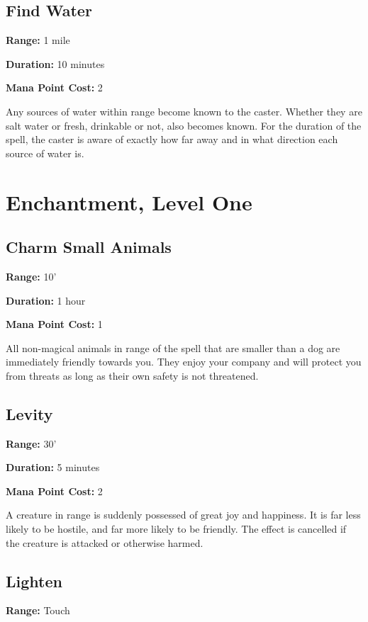 \begin{multicols}{2}
\subsection{Find Water}

\textbf{Range:} 1 mile

\textbf{Duration:} 10 minutes

\textbf{Mana Point Cost:} 2

Any sources of water within range become known to the
caster. Whether they are salt water or fresh, drinkable
or not, also becomes known. For the duration of the
spell, the caster is aware of exactly how far away and
in what direction each source of water is.

\section{Enchantment, Level One}

\subsection{Charm Small Animals}

\textbf{Range:} 10'

\textbf{Duration:} 1 hour

\textbf{Mana Point Cost:} 1

All non-magical animals in range of the spell that are smaller than
a dog are immediately friendly towards you. They enjoy your company
and will protect you from threats as long as their own safety is
not threatened.

\subsection{Levity}

\textbf{Range:} 30'

\textbf{Duration:} 5 minutes

\textbf{Mana Point Cost:} 2

A creature in range is suddenly possessed of great joy and happiness.
It is far less likely to be hostile, and far more likely to be
friendly. The effect is cancelled if the creature is attacked or
otherwise harmed.

\subsection{Lighten}

\textbf{Range:} Touch


\end{multicols}
